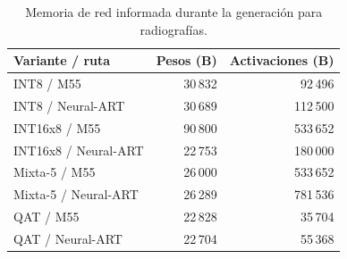 \begin{table}[H]
\centering\small
\caption{Memoria de red informada durante la generación para radiografías.}\label{tab:rx_memoria}
\begin{tabularx}{\linewidth}{Yrr}\toprule
Variante / ruta & Pesos (B) & Activaciones (B)\\\midrule
INT8 / M55 & 30\,832 & 92\,496\\
INT8 / Neural-ART & 30\,689 & 112\,500\\
INT16x8 / M55 & 90\,800 & 533\,652\\
INT16x8 / Neural-ART & 22\,753 & 180\,000\\
Mixta-5 / M55 & 26\,000 & 533\,652\\
Mixta-5 / Neural-ART & 26\,289 & 781\,536\\
QAT / M55 & 22\,828 & 35\,704\\
QAT / Neural-ART & 22\,704 & 55\,368\\
\bottomrule\end{tabularx}
\end{table}
